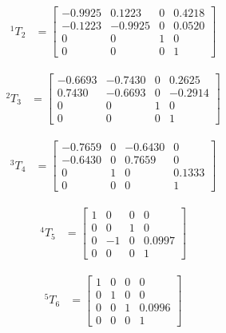 \documentclass[fleqn]{article}
\begin{document}
\begin{equation}
\begin{split}
^{1}T_{2}&=\begin{bmatrix}
-0.9925 & 0.1223 & 0 & 0.4218\\
-0.1223 & -0.9925 & 0 & 0.0520\\
0 & 0 & 1 & 0\\
0 & 0 & 0 & 1
\end{bmatrix}
\end{split}
\end{equation}

\begin{equation}
\begin{split}
^{2}T_{3}&=\begin{bmatrix}
-0.6693 & -0.7430 & 0 & 0.2625\\
0.7430 & -0.6693 & 0 & -0.2914\\
0 & 0 & 1 & 0\\
0 & 0 & 0 & 1
\end{bmatrix}
\end{split}
\end{equation}

\begin{equation}
\begin{split}
^{3}T_{4}&=\begin{bmatrix}
-0.7659 & 0 & -0.6430 & 0\\
-0.6430 & 0 & 0.7659 & 0\\
0 & 1 & 0 & 0.1333\\
0 & 0 & 0 & 1
\end{bmatrix}
\end{split}
\end{equation}

\begin{equation}
\begin{split}
^{4}T_{5}&=\begin{bmatrix}
1 & 0 & 0 & 0\\
0 & 0 & 1 & 0\\
0 & -1 & 0 & 0.0997\\
0 & 0 & 0 & 1
\end{bmatrix}
\end{split}
\end{equation}

\begin{equation}
\begin{split}
^{5}T_{6}&=\begin{bmatrix}
1 & 0 & 0 & 0\\
0 & 1 & 0 & 0\\
0 & 0 & 1 & 0.0996\\
0 & 0 & 0 & 1
\end{bmatrix}
\end{split}
\end{equation}
\end{document}
